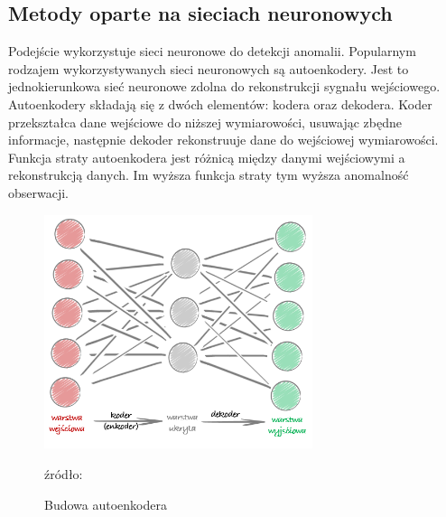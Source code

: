 \subsection {Metody oparte na sieciach neuronowych}
Podejście wykorzystuje sieci neuronowe do detekcji anomalii. Popularnym rodzajem wykorzystywanych sieci neuronowych są autoenkodery. Jest to jednokierunkowa sieć neuronowe zdolna do rekonstrukcji sygnału wejściowego. Autoenkodery składają się z dwóch elementów: kodera oraz dekodera. Koder przekształca dane wejściowe do niższej wymiarowości, usuwając zbędne informacje, następnie dekoder rekonstruuje dane do wejściowej wymiarowości. Funkcja straty autoenkodera  jest różnicą między danymi wejściowymi a rekonstrukcją danych. Im wyższa funkcja straty tym wyższa anomalność obserwacji.
\begin{figure}
    \centering
    \includegraphics[width = 0.7\textwidth]{chapters/istniejace/images/03-2.png}
    \caption{Budowa autoenkodera}
    \footnotesize{źródło: \cite{ae}}
    \label{fig:pudleko}
\end{figure}
